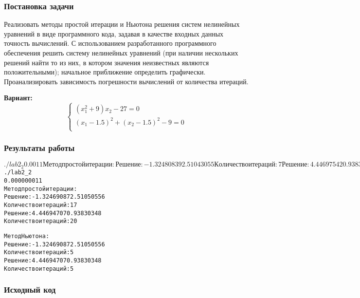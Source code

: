 \subsubsection{Постановка задачи}
Реализовать методы простой итерации и Ньютона решения систем нелинейных уравнений в виде программного кода, задавая в качестве входных данных точность вычислений. С использованием разработанного программного обеспечения решить систему нелинейных уравнений (при наличии нескольких решений найти то из них, в котором значения неизвестных являются положительными); начальное приближение определить графически. Проанализировать зависимость погрешности вычислений от количества итераций.

{\bfseries Вариант:}
\begin{equation*}
\begin{cases}
(x_1^2 + 9) x_2 - 27 = 0\\
(x_1 - 1.5)^2 + (x_2 - 1.5)^2 - 9 = 0\\
\end{cases}
\end{equation*}

\subsubsection{Результаты работы}
\begin{alltt}
$ ./lab2_2
0.001 1
Метод простой итерации:
Решение: -1.32480839 2.51043055
Количество итераций: 7
Решение: 4.44697542 0.93831944
Количество итераций: 9

Метод Ньютона:
Решение: -1.32469087 2.51050556
Количество итераций: 4
Решение: 4.44694707 0.93830348
Количество итераций: 4

$ ./lab2_2
0.00000001 1
Метод простой итерации:
Решение: -1.32469087 2.51050556
Количество итераций: 17
Решение: 4.44694707 0.93830348
Количество итераций: 20

Метод Ньютона:
Решение: -1.32469087 2.51050556
Количество итераций: 5
Решение: 4.44694707 0.93830348
Количество итераций: 5
\end{alltt}

\subsubsection{Исходный код}

\pagebreak